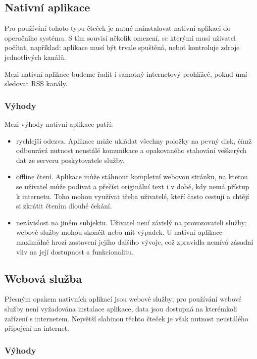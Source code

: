\subsection{Nativní aplikace}

Pro používání tohoto typu čteček je nutné nainstalovat nativní aplikaci do operačního systému.
S tím souvisí několik omezení, se kterými musí uživatel počítat, například: aplikace musí být trvale spuštěná, neboť kontroluje zdroje jednotlivých kanálů.


Mezi nativní aplikace budeme řadit i samotný internetový prohlížeč, pokud umí sledovat RSS kanály.

\subsubsection{Výhody}

Mezi výhody nativní aplikace patří:
\begin{itemize}
    \item rychlejší odezva.
        Aplikace může ukládat všechny položky na pevný disk, čímž odbourává nutnost neustálé komunikace a opakovaného stahování veškerých dat ze serveru poskytovatele služby.
    \item offline čtení.
        Aplikace může stáhnout kompletní webovou stránku, na kterou se uživatel může podívat a přečíst originální text i v době, kdy nemá přístup k internetu.
		Toho mohou využívat třeba uživatelé, kteří často cestují a chtějí si zkrátit čtením dlouhé čekání.
    \item nezávislost na jiném subjektu.
        Uživatel není závislý na provozovateli služby; webové služby mohou skončit nebo mít výpadek.
        U nativní aplikace maximálně hrozí zastavení jejího dalšího vývoje, což zpravidla nemívá zásadní vliv na její dostupnost a funkcionalitu.
\end{itemize}

\subsection{Webová služba}

Přesným opakem nativních aplikací jsou webové služby; pro používání webové služby není vyžadována instalace aplikace, data jsou dostupná na kterémkoli zařízení s internetem.
Největší slabinou těchto čteček je však nutnost neustálého připojení na internet.

\subsubsection{Výhody}

